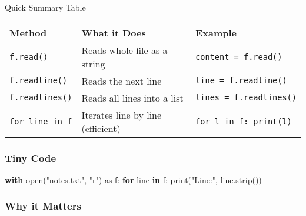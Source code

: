 \documentclass[
  letterpaper,
  DIV=11,
  numbers=noendperiod]{scrreprt}
\newenvironment{Shaded}{\begin{snugshade}}{\end{snugshade}}
\newcommand{\BuiltInTok}[1]{\textcolor[rgb]{0.00,0.23,0.31}{#1}}
\newcommand{\ControlFlowTok}[1]{\textcolor[rgb]{0.00,0.23,0.31}{\textbf{#1}}}
\newcommand{\ImportTok}[1]{\textcolor[rgb]{0.00,0.46,0.62}{#1}}
\newcommand{\KeywordTok}[1]{\textcolor[rgb]{0.00,0.23,0.31}{\textbf{#1}}}
\newcommand{\NormalTok}[1]{\textcolor[rgb]{0.00,0.23,0.31}{#1}}
\newcommand{\StringTok}[1]{\textcolor[rgb]{0.13,0.47,0.30}{#1}}
\begin{document}
Quick Summary Table

\begin{longtable}[]{@{}
  >{\raggedright\arraybackslash}p{}
  >{\raggedright\arraybackslash}p{}
  >{\raggedright\arraybackslash}p{}@{}}
\toprule\noalign{}
\begin{minipage}[b]{\linewidth}\raggedright
Method
\end{minipage} & \begin{minipage}[b]{\linewidth}\raggedright
What it Does
\end{minipage} & \begin{minipage}[b]{\linewidth}\raggedright
Example
\end{minipage} \\
\midrule\noalign{}
\endhead
\bottomrule\noalign{}
\endlastfoot
\texttt{f.read()} & Reads whole file as a string &
\texttt{content\ =\ f.read()} \\
\texttt{f.readline()} & Reads the next line &
\texttt{line\ =\ f.readline()} \\
\texttt{f.readlines()} & Reads all lines into a list &
\texttt{lines\ =\ f.readlines()} \\
\texttt{for\ line\ in\ f} & Iterates line by line (efficient) &
\texttt{for\ l\ in\ f:\ print(l)} \\
\end{longtable}

\subsubsection{Tiny Code}\label{tiny-code-51}

\begin{Shaded}
\begin{Highlighting}[]
\ControlFlowTok{with} \BuiltInTok{open}\NormalTok{(}\StringTok{"notes.txt"}\NormalTok{, }\StringTok{"r"}\NormalTok{) }\ImportTok{as}\NormalTok{ f:}
    \ControlFlowTok{for}\NormalTok{ line }\KeywordTok{in}\NormalTok{ f:}
        \BuiltInTok{print}\NormalTok{(}\StringTok{"Line:"}\NormalTok{, line.strip())}
\end{Highlighting}
\end{Shaded}

\subsubsection{Why it Matters}\label{why-it-matters-51}
\end{document}
